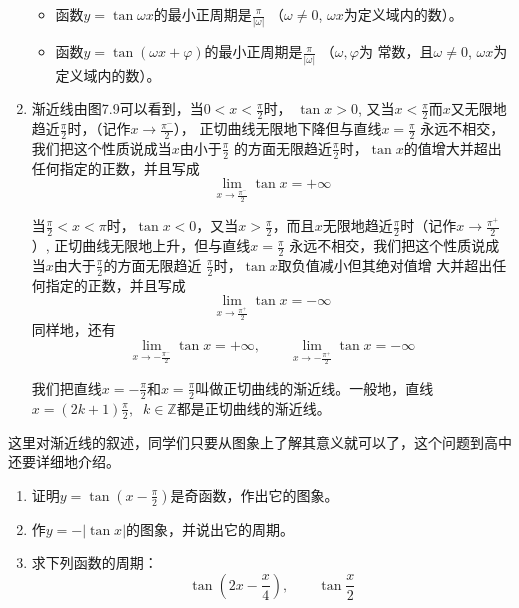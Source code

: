 \begin{enumerate}
\begin{itemize}
    \item 函数$y=\tan \omega x$的最小正周期是$\frac{\pi}{|\omega|}$ （$\omega\ne 0$,  $\omega x$为定义域内的数）。

    \item    函数$y=\tan (\omega x+\varphi)$的最小正周期是$\frac{\pi}{|\omega|}$ （$\omega,\varphi$为
    常数，且$\omega\ne 0$, $\omega x$为定义域内的数）。
\end{itemize}

\item  渐近线\quad 由图7.9可以看到，当$0<x<\frac{\pi}{2}$时，
$\tan x>0$, 又当$x<\frac{\pi}{2}$而$x$又无限地趋近$\frac{\pi}{2}$时，（记作$x\to \frac{\pi^-}{2}$），
正切曲线无限地下降但与直线$x=\frac{\pi}{2}$
永远不相交，我们把这个性质说成当$x$由小于$\frac{\pi}{2}$
的方面无限趋近$\frac{\pi}{2}$时，$\tan x$的值增大并超出任何指定的正数，并且写成
\[\lim_{x\to\tfrac{\pi^-}{2}}\tan x=+\infty  \]

当$\frac{\pi}{2}<x<\pi$时，$\tan x<0$，又当$x>\frac{\pi}{2}$，而且$x$无限地趋近$\frac{\pi}{2}$时（记作$x\to\frac{\pi^+}{2}$）,
正切曲线无限地上升，但与直线$x=\frac{\pi}{2}$
永远不相交，我们把这个性质说成当$x$由大于$\frac{\pi}{2}$的方面无限趋近
$\frac{\pi}{2}$时，$\tan x$取负值减小但其绝对值增
大并超出任何指定的正数，并且写成
\[\lim_{x\to\tfrac{\pi^+}{2}}\tan x=-\infty  \]
同样地，还有
\[\lim_{x\to -\tfrac{\pi^-}{2}}\tan x=+\infty,\qquad  \lim_{x\to -\tfrac{\pi^+}{2}}\tan x=-\infty \]

我们把直线$x=-\frac{\pi}{2}$和$x=\frac{\pi}{2}$叫做正切曲线的渐近线。一般地，直线$x=(2k+1)\frac{\pi}{2},\;\; k\in\mathbb{Z}$都是正切曲线的渐近线。
\end{enumerate}

\begin{rmk}
    这里对渐近线的叙述，同学们只要从图象上了解其意义就可以了，这个问题到高中还要详细地介绍。 
\end{rmk}

\begin{ex}
\begin{enumerate}
    \item 证明$y=\tan\left(x-\frac{\pi}{2}\right)$是奇函数，作出它的图象。
    \item 作$y=-|\tan x|$的图象，并说出它的周期。
    \item 求下列函数的周期：
    \[\tan\left(2x-\frac{x}{4}\right),\qquad \tan \frac{x}{2} \]
\end{enumerate}
\end{ex}

